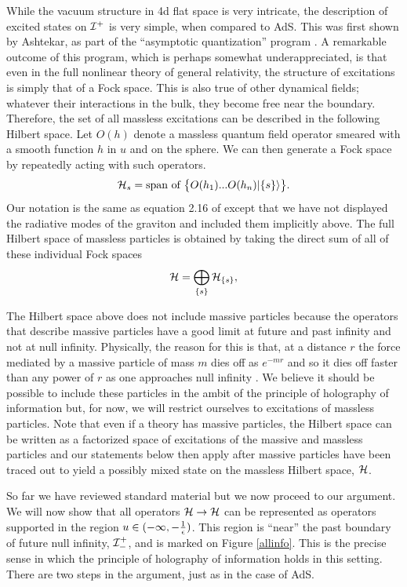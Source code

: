\documentclass[12pt]{article}
\def\hilb[#1]{{\cal H}_{#1}}
\newcommand{\be}{\begin{equation}}
\newcommand{\ee}{\end{equation}}
\def \scrip{{\cal I}^{+}}
\def \scrippast{{\cal I}^{+}_{-}}
\def\supcharge[#1]{\{#1\}}
\begin{document}
While the vacuum structure in 4d flat space is very intricate, the description of excited states on $\scrip$ is very simple, when compared to AdS. This was first shown by Ashtekar, as part of the ``asymptotic quantization'' program  \cite{Ashtekar:1981sf,Ashtekar:1981hw,Ashtekar:1987tt,Ashtekar:2018lor}. A remarkable outcome of this program, which is perhaps somewhat underappreciated, is that even in the full nonlinear theory of general relativity, the structure of excitations is simply that of a Fock space. This is also true of other dynamical fields; whatever their interactions in the bulk, they become free near the boundary. Therefore,
the set of all massless excitations can be described in the following Hilbert space.  Let $O(h)$ denote a massless quantum field operator smeared with a smooth function $h$ in $u$ and on the sphere. We can then generate a Fock space by repeatedly acting with such operators.
\be
\label{hilbsexc}
\hilb[s] = \text{span~of~}\big\{O(h_1) ... O(h_n) | \{s \} \rangle \big\}.
\ee
Our notation is the same as equation 2.16 of \cite{Laddha:2020kvp} except that we have not displayed the radiative modes of the graviton and included them implicitly above. The full Hilbert space of massless particles is obtained by taking the direct sum of all of these individual Fock spaces
\be
\label{hfulldef}
{\cal H} = \bigoplus_{\supcharge[s]} {\cal H}_{\supcharge[s]},
\ee

The Hilbert space above does not include massive particles because the operators that describe massive particles have a good limit at future and past infinity and not at null infinity. Physically, the reason for this is that, at a distance $r$ the force mediated by a massive particle of mass $m$ dies off as $e^{-m r}$ and so it dies off faster than any power of $r$ as one approaches null infinity \cite{winicour1988massive}. We believe it should be possible to include these particles in the ambit of the principle of holography of information but, for now, we will restrict ourselves to excitations of massless particles. Note that even if a theory has massive particles, the Hilbert space can be written as a factorized space of excitations of the massive and massless particles \cite{Campiglia:2015kxa} and our statements below then apply after massive particles have been traced out to yield a possibly mixed state on the massless Hilbert space, ${\cal H}$.



So far we have reviewed standard material but we now proceed to our argument. We will now show that all operators ${\cal H} \rightarrow {\cal H}$ can be represented as operators supported in the region $u \in (-\infty, -{1 \over \epsilon})$. This region is ``near'' the past boundary of future null infinity,  $\scrippast$, and is marked on  Figure \ref{allinfo}. This is the precise sense in which the principle of holography of information holds in this setting. There are two steps in the argument, just as in the case of AdS.
\end{document}

